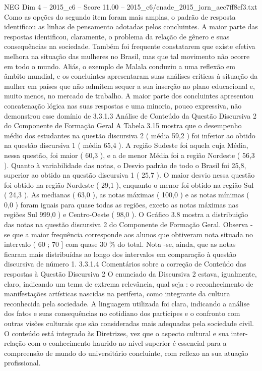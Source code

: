 \begin{textsample}{NEG Dim 4 – 2015\_c6 – Score 11.00 – 2015\_c6/enade\_2015\_jorn\_aec7ff8cf3.txt}
Como as opções do segundo item foram mais amplas, o padrão de resposta identificou as linhas de pensamento adotadas pelos concluintes.
A maior parte das respostas identificou, claramente, o problema da relação de gênero e suas consequências na sociedade.
Também foi frequente constatarem que existe efetiva melhora na situação das mulheres no Brasil, mas que tal movimento não ocorre em todo o mundo.
Aliás, o exemplo de Malala conduziu a uma reflexão em âmbito mundial, e os concluintes apresentaram suas análises críticas à situação da mulher em países que não admitem sequer a sua inserção no plano educacional e, muito menos, no mercado de trabalho.
A maior parte dos concluintes apresentou concatenação lógica nas suas respostas e uma minoria, pouco expressiva, não demonstrou esse domínio de 3.3.1.3 Análise de Conteúdo da Questão Discursiva 2 do Componente de Formação Geral A Tabela 3.15 mostra que o desempenho médio dos estudantes na questão discursiva 2 ( média 59,2 ) foi inferior ao obtido na questão discursiva 1 ( média 65,4 ).
A região Sudeste foi aquela cuja Média, nessa questão, foi maior ( 60,3 ), e a de menor Média foi a região Nordeste ( 56,3 ).
Quanto à variabilidade das notas, o Desvio padrão de todo o Brasil foi 25,8, superior ao obtido na questão discursiva 1 ( 25,7 ).
O maior desvio nessa questão foi obtido na região Nordeste ( 29,1 ), enquanto o menor foi obtido na região Sul ( 24,3 ).
As medianas ( 63,0 ), as notas máximas ( 100,0 ) e as notas mínimas ( 0,0 ) foram iguais para quase todas as regiões, exceto as notas máximas nas regiões Sul 999,0 ) e Centro-Oeste ( 98,0 ).
O Gráfico 3.8 mostra a distribuição das notas na questão discursiva 2 do Componente de Formação Geral.
Observa -se que a maior frequência corresponde aos alunos que obtiveram nota situada no intervalo ( 60 ; 70 ] com quase 30 \% do total.
Nota -se, ainda, que as notas ficaram mais distribuídas ao longo dos intervalos em comparação à questão discursiva de número 1. 3.3.1.4 Comentários sobre a correção de Conteúdo das respostas à Questão Discursiva 2 O enunciado da Discursiva 2 estava, igualmente, claro, indicando um tema de extrema relevância, qual seja : o reconhecimento de manifestações artísticas nascidas na periferia, como integrante da cultura reconhecida pela sociedade.
A linguagem utilizada foi clara, indicando a análise dos fatos e suas consequências no cotidiano dos partícipes e o confronto com outras visões culturais que são consideradas mais adequadas pela sociedade civil.
O conteúdo está integrado às Diretrizes, vez que o aspecto cultural e sua inter-relação com o conhecimento haurido no nível superior é essencial para a compreensão de mundo do universitário concluinte, com reflexo na sua atuação profissional.

\end{textsample}
